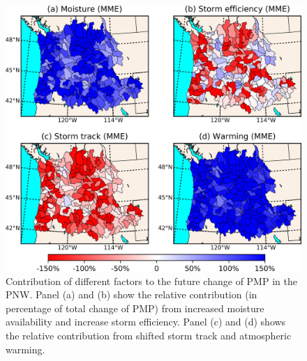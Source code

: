 \begin{figure}[htbp]
	\includegraphics[width=\linewidth]{pics/ch5/fig11.jpg}
	\caption{Contribution of different factors to the future change of PMP in the PNW. Panel (a) and (b) show the relative contribution (in percentage of total change of PMP) from increased moisture availability and increase storm efficiency. Panel (c) and (d) shows the relative contribution from shifted storm track and atmospheric warming.}
	\label{fig:5-11}
\end{figure}

